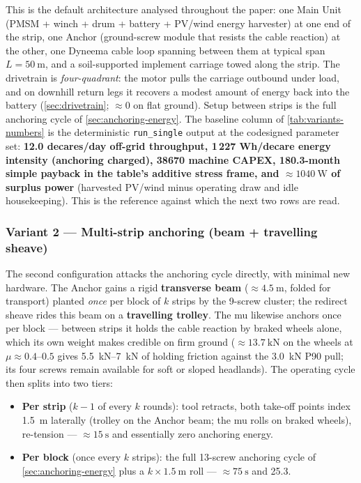 \documentclass[11pt,a4paper]{article}
\begin{document}
This is the default architecture analysed throughout the paper: one Main Unit (PMSM + winch + drum + battery + PV/wind energy harvester) at one end of the strip, one Anchor (ground-screw module that resists the cable reaction) at the other, one Dyneema cable loop spanning between them at typical span $L = \SI{50}{\meter}$, and a soil-supported implement carriage towed along the strip. The drivetrain is \emph{four-quadrant}: the motor pulls the carriage outbound under load, and on downhill return legs it recovers a modest amount of energy back into the battery (\cref{sec:drivetrain}; ${\approx}0$ on flat ground). Setup between strips is the full anchoring cycle of \cref{sec:anchoring-energy}. The baseline column of \cref{tab:variants-numbers} is the deterministic \texttt{run\_single} output at the codesigned parameter set: \textbf{12.0 decares/day off-grid throughput, 1\,227 Wh/decare energy intensity (anchoring charged), \SI{38670}{\EUR} machine CAPEX, 180.3-month simple payback in the table's additive stress frame, and ${\approx}\SI{1040}{\watt}$ of surplus power} (harvested PV/wind minus operating draw and idle housekeeping). This is the reference against which the next two rows are read.

\subsubsection{Variant 2 --- Multi-strip anchoring (beam + travelling sheave)}\label{sec:variant-beam}

The second configuration attacks the anchoring cycle directly, with minimal new hardware. The Anchor gains a rigid \textbf{transverse beam} (${\approx}\SI{4.5}{\meter}$, folded for transport) planted \emph{once} per block of $k$ strips by the 9-screw cluster; the redirect sheave rides this beam on a \textbf{travelling trolley}. The \gls{mu} likewise anchors once per block --- between strips it holds the cable reaction by braked wheels alone, which its own weight makes credible on firm ground (${\approx}\SI{13.7}{\kilo\newton}$ on the wheels at $\mu \approx 0.4$--$0.5$ gives \SIrange{5.5}{7}{\kilo\newton} of holding friction against the \SI{3.0}{\kilo\newton} P90 pull; its four screws remain available for soft or sloped headlands). The operating cycle then splits into two tiers:

\begin{itemize}[leftmargin=1.6em,itemsep=0.1em]
    \item \textbf{Per strip} ($k-1$ of every $k$ rounds): tool retracts, both take-off points index \SI{1.5}{\meter} laterally (trolley on the Anchor beam; the \gls{mu} rolls on braked wheels), re-tension --- ${\approx}\SI{15}{\second}$ and essentially zero anchoring energy.
    \item \textbf{Per block} (once every $k$ strips): the full 13-screw anchoring cycle of \cref{sec:anchoring-energy} plus a $k \times \SI{1.5}{\meter}$ roll --- ${\approx}\SI{75}{\second}$ and \SI{25.3}{\Wh}.
\end{itemize}
\end{document}
